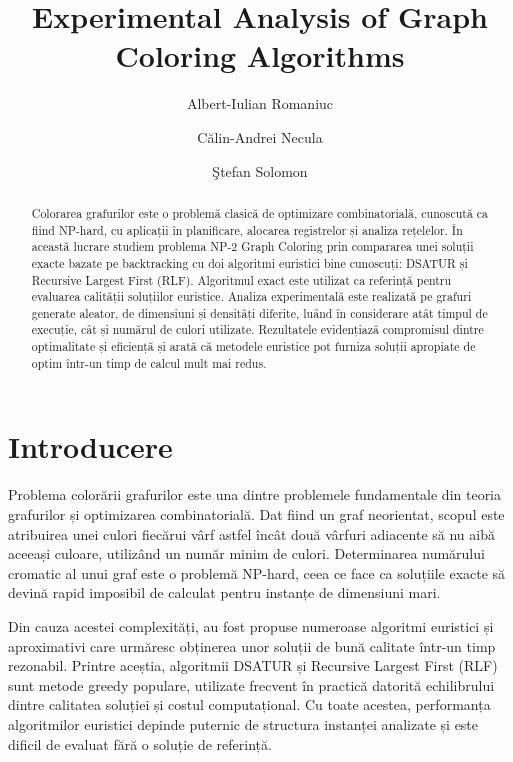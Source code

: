 \documentclass[runningheads]{llncs}
\begin{document}
\title{Experimental Analysis of Graph Coloring Algorithms}

\author{
Albert-Iulian Romaniuc \and
C\u{a}lin-Andrei Necula \and
\c{S}tefan Solomon
}


\maketitle

\begin{abstract}
Colorarea grafurilor este o problemă clasică de optimizare combinatorială,
cunoscută ca fiind NP-hard, cu aplicații în planificare, alocarea
registrelor și analiza rețelelor. În această lucrare studiem problema
NP-2 Graph Coloring prin compararea unei soluții exacte bazate pe backtracking
cu doi algoritmi euristici bine cunoscuți: DSATUR și Recursive Largest First
(RLF). Algoritmul exact este utilizat ca referință pentru evaluarea calității
soluțiilor euristice. Analiza experimentală este realizată pe grafuri generate
aleator, de dimensiuni și densități diferite, luând în considerare atât timpul
de execuție, cât și numărul de culori utilizate. Rezultatele evidențiază
compromisul dintre optimalitate și eficiență și arată că metodele euristice
pot furniza soluții apropiate de optim într-un timp de calcul mult mai redus.
\end{abstract}

\section{Introducere}

Problema colorării grafurilor este una dintre problemele fundamentale din
teoria grafurilor și optimizarea combinatorială. Dat fiind un graf neorientat,
scopul este atribuirea unei culori fiecărui vârf astfel încât două vârfuri
adiacente să nu aibă aceeași culoare, utilizând un număr minim de culori.
Determinarea numărului cromatic al unui graf este o problemă NP-hard,
ceea ce face ca soluțiile exacte să devină rapid imposibil de calculat pentru
instanțe de dimensiuni mari.

Din cauza acestei complexități, au fost propuse numeroase algoritmi euristici
și aproximativi care urmăresc obținerea unor soluții de bună calitate într-un
timp rezonabil. Printre aceștia, algoritmii DSATUR și Recursive Largest First
(RLF) sunt metode greedy populare, utilizate frecvent în practică datorită
echilibrului dintre calitatea soluției și costul computațional. Cu toate
acestea, performanța algoritmilor euristici depinde puternic de structura
instanței analizate și este dificil de evaluat fără o soluție de referință.
\end{document}
